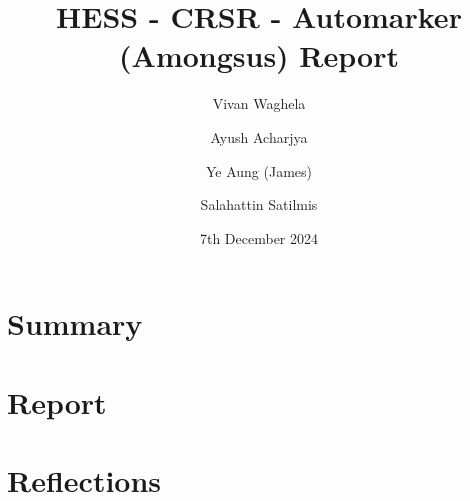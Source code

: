 \documentclass[a4paper, 12pt]{article}
\begin{document}
\title{HESS - CRSR - Automarker (Amongsus) Report}
\author{Vivan Waghela \and Ayush Acharjya \and Ye Aung (James) \and Salahattin Satilmis}
\date{7th December 2024}
\maketitle

\section*{Summary}

\section*{Report}

\section*{Reflections}
\end{document}
